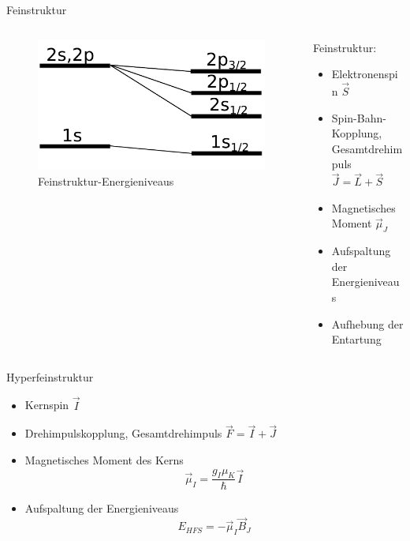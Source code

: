 \documentclass{beamer}
\begin{document}
\begin{frame}{Feinstruktur}
\begin{columns}
\begin{column}{4.5cm}
	\begin{figure}[H]
	\centering \includegraphics[width=\textwidth]{Bilder/feinstruktur.pdf}
	\caption{Feinstruktur-Energieniveaus}
	\end{figure}
\end{column}
\begin{column}{5.5cm}
Feinstruktur:
\begin{itemize}
	\item Elektronenspin $\vec S$
	\item Spin-Bahn-Kopplung, Gesamtdrehimpuls $\vec J = \vec L + \vec S$
	\item Magnetisches Moment $\vec\mu_J$
	\item Aufspaltung der Energieniveaus
	\item Aufhebung der Entartung
\end{itemize}
\end{column}
\end{columns}
\end{frame}


\begin{frame}{Hyperfeinstruktur}
\begin{itemize}
\item Kernspin $\vec I$
\item Drehimpulskopplung, Gesamtdrehimpuls $\vec F = \vec I + \vec J$
\item Magnetisches Moment des Kerns $$\vec \mu_I = \frac{g_I\mu_K}{\hbar} \vec I $$
\item Aufspaltung der Energieniveaus $$E_{HFS} = -\vec\mu_I\vec B_J$$
\end{itemize}
\end{frame}
\end{document}
